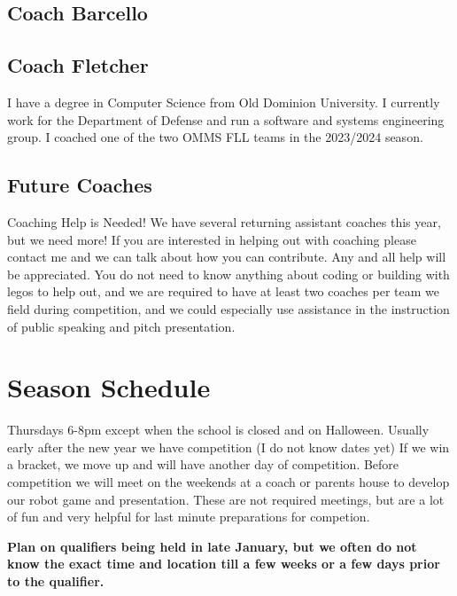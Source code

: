\documentclass[letter]{article}
\begin{document}
\hypertarget{coach-barcello}{%
\subsection{Coach Barcello}\label{coach-barcello}}

\hypertarget{coach-fletcher}{%
\subsection{Coach Fletcher}\label{coach-fletcher}}

I have a degree in Computer Science from Old Dominion University. I currently work for the Department of Defense and run a software and systems engineering group. I coached one of the two OMMS FLL teams in the 2023/2024 season.

\hypertarget{future-coaches}{%
\subsection{Future Coaches}\label{future-coaches}}

Coaching Help is Needed! We have several returning assistant coaches
this year, but we need more! If you are interested in helping out with
coaching please contact me and we can talk about how you can contribute.
Any and all help will be appreciated. You do not need to know anything about coding or building with legos to help out, and we are required to have at least two coaches per team we field during competition, and we could especially use assistance in the instruction of public speaking and pitch presentation.

\hypertarget{meeting-schedule}{%
\section{Season Schedule}\label{meeting-schedule}}

Thursdays 6-8pm except when the school is closed and on Halloween. Usually
early after the new year we have competition (I do not know dates yet)
If we win a bracket, we move up and will have another day of
competition. Before competition we will meet on the weekends at a coach
or parents house to develop our robot game and presentation. These are
not required meetings, but are a lot of fun and very helpful for last
minute preparations for competion.

\textbf{Plan on qualifiers being held in late January, but we often do not know the exact time and location till a few weeks or a few days prior to the qualifier.}
\end{document}
